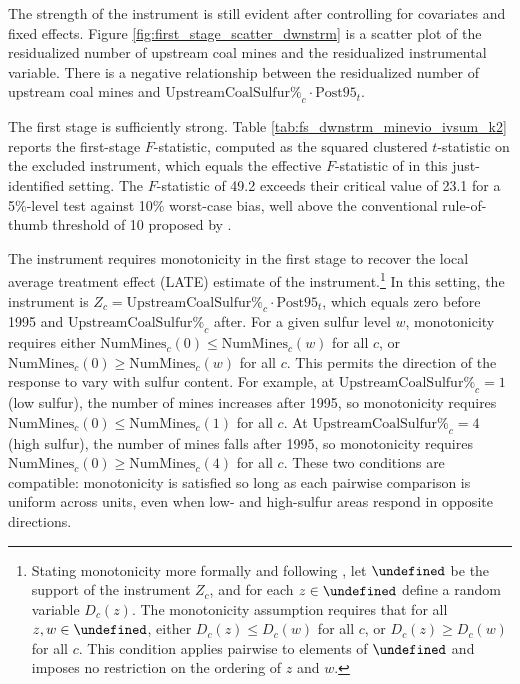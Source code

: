 \documentclass[12pt]{article}
\let\Psi\undefined
\begin{document}
The strength of the instrument is still evident after controlling for covariates and fixed effects. Figure \ref{fig:first_stage_scatter_dwnstrm} is a scatter plot of the residualized number of upstream coal mines and the residualized instrumental variable. There is a negative relationship between the residualized number of upstream coal mines and $\text{UpstreamCoalSulfur\%}_c \cdot \text{Post95}_t$.

The first stage is sufficiently strong. Table \ref{tab:fs_dwnstrm_minevio_ivsum_k2} reports the first-stage $F$-statistic, computed as the squared clustered $t$-statistic on the excluded instrument, which equals the effective $F$-statistic of \textcite{montielolea2013robust} in this just-identified setting. The $F$-statistic of 49.2 exceeds their critical value of 23.1 for a 5\%-level test against 10\% worst-case bias, well above the conventional rule-of-thumb threshold of 10 proposed by \textcite{staigerstock1997instrumental}.

The instrument requires monotonicity in the first stage to recover the local average treatment effect (LATE) estimate of the instrument.\footnote{Stating monotonicity more formally and following \textcite{angrist1994identification}, let $\Psi$ be the support of the instrument $Z_c$, and for each $z \in \Psi$ define a random variable $D_c(z)$. The monotonicity assumption requires that for all $z, w \in \Psi$, either $D_c(z) \leq D_c(w)$ for all $c$, or $D_c(z) \geq D_c(w)$ for all $c$. This condition applies pairwise to elements of $\Psi$ and imposes no restriction on the ordering of $z$ and $w$.} In this setting, the instrument is $Z_c = \text{UpstreamCoalSulfur\%}_c \cdot \text{Post95}_t$, which equals zero before 1995 and $\text{UpstreamCoalSulfur\%}_c$ after. For a given sulfur level $w$, monotonicity requires either $\text{NumMines}_c(0) \leq \text{NumMines}_c(w)$ for all $c$, or $\text{NumMines}_c(0) \geq \text{NumMines}_c(w)$ for all $c$. This permits the direction of the response to vary with sulfur content. For example, at $\text{UpstreamCoalSulfur\%}_c = 1$ (low sulfur), the number of mines increases after 1995, so monotonicity requires $\text{NumMines}_c(0) \leq \text{NumMines}_c(1)$ for all $c$. At $\text{UpstreamCoalSulfur\%}_c = 4$ (high sulfur), the number of mines falls after 1995, so monotonicity requires $\text{NumMines}_c(0) \geq \text{NumMines}_c(4)$ for all $c$. These two conditions are compatible: monotonicity is satisfied so long as each pairwise comparison is uniform across units, even when low- and high-sulfur areas respond in opposite directions.
\end{document}
